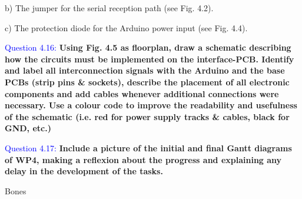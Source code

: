 \documentclass[12pt, a4papre]{article}
\begin{document}
	b)  The jumper for the serial reception path (see Fig. 4.2).
	
	c)  The protection diode for the Arduino power input (see Fig. 4.4).

	\textcolor{blue}{Question 4.16:} \textbf{Using Fig. 4.5 as floorplan, draw a schematic describing how the circuits must be implemented on the interface-PCB. Identify and label all interconnection signals with the Arduino and the base PCBs (strip pins \& sockets), describe the placement of all electronic components and add cables whenever additional connections were necessary. Use a colour code to improve the readability and usefulness of the schematic (i.e. red for power supply tracks \& cables, black for GND, etc.)}

	\textcolor{blue}{Question 4.17:} \textbf{Include a picture of the initial and final Gantt diagrams of WP4, making a reflexion about the progress and explaining any delay in the development of the tasks.  }

	Bones 
\end{document}
